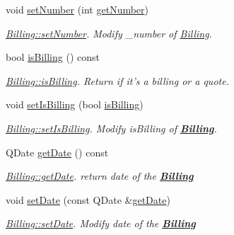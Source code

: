 \begin{DoxyCompactItemize}
void \hyperlink{classModels_1_1Billing_a2b43e0c657a9e717c9d2c091d222369e}{set\-Number} (int \hyperlink{classModels_1_1Billing_a48c6e28a4aec13f8ed6b3ebbab837f0b}{get\-Number})
\begin{DoxyCompactList}\small\item\em \hyperlink{classModels_1_1Billing_a2b43e0c657a9e717c9d2c091d222369e}{Billing\-::set\-Number}. Modify {\itshape \-\_\-number} of \hyperlink{classModels_1_1Billing}{Billing}. \end{DoxyCompactList}\item 
bool \hyperlink{classModels_1_1Billing_ab03dd29a9812a995355a1d93318f348f}{is\-Billing} () const 
\begin{DoxyCompactList}\small\item\em \hyperlink{classModels_1_1Billing_ab03dd29a9812a995355a1d93318f348f}{Billing\-::is\-Billing}. Return if it's a billing or a quote. \end{DoxyCompactList}\item 
void \hyperlink{classModels_1_1Billing_aff8b71426c02bc97f0a724ef762cd42e}{set\-Is\-Billing} (bool \hyperlink{classModels_1_1Billing_ab03dd29a9812a995355a1d93318f348f}{is\-Billing})
\begin{DoxyCompactList}\small\item\em \hyperlink{classModels_1_1Billing_aff8b71426c02bc97f0a724ef762cd42e}{Billing\-::set\-Is\-Billing}. Modify {\itshape is\-Billing} of {\bfseries \hyperlink{classModels_1_1Billing}{Billing}}. \end{DoxyCompactList}\item 
Q\-Date \hyperlink{classModels_1_1Billing_af0d1f0132d0902fb96456d0a9018b701}{get\-Date} () const 
\begin{DoxyCompactList}\small\item\em \hyperlink{classModels_1_1Billing_af0d1f0132d0902fb96456d0a9018b701}{Billing\-::get\-Date}. return date of the {\bfseries \hyperlink{classModels_1_1Billing}{Billing}} \end{DoxyCompactList}\item 
void \hyperlink{classModels_1_1Billing_ae8db0fe5fe273fad31e2f846b5b891cb}{set\-Date} (const Q\-Date \&\hyperlink{classModels_1_1Billing_af0d1f0132d0902fb96456d0a9018b701}{get\-Date})
\begin{DoxyCompactList}\small\item\em \hyperlink{classModels_1_1Billing_ae8db0fe5fe273fad31e2f846b5b891cb}{Billing\-::set\-Date}. Modify {\itshape date} of the {\bfseries \hyperlink{classModels_1_1Billing}{Billing}} \end{DoxyCompactList}\item 

\end{DoxyCompactItemize}
